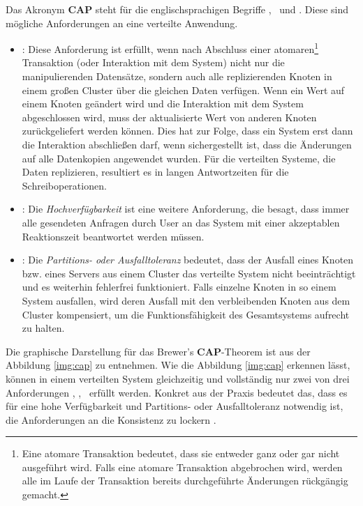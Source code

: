 Das Akronym \textbf{CAP} steht für die englischsprachigen Begriffe  \Cap, \cAp\ und \caP. Diese sind mögliche Anforderungen an eine verteilte Anwendung.
\begin{itemize}
\item \Cap: Diese Anforderung ist erfüllt, wenn nach Abschluss einer atomaren\footnote{Eine atomare Transaktion bedeutet, dass sie entweder ganz oder gar nicht ausgeführt wird. Falls eine atomare Transaktion abgebrochen wird, werden alle im Laufe der Transaktion bereits durchgeführte Änderungen rückgängig gemacht.} Transaktion (oder Interaktion mit dem System) nicht nur die manipulierenden Datensätze, sondern auch alle replizierenden Knoten in einem großen Cluster über die gleichen Daten verfügen. Wenn ein Wert auf einem Knoten geändert wird und die Interaktion mit dem System abgeschlossen wird, muss der aktualisierte Wert von anderen Knoten zurückgeliefert werden können. Dies hat zur Folge, dass ein System erst dann die Interaktion abschließen darf, wenn sichergestellt ist, dass die Änderungen auf alle Datenkopien angewendet wurden. Für die verteilten Systeme, die Daten replizieren, resultiert es in langen Antwortzeiten für die Schreiboperationen.

\item \cAp: Die \textit{Hochverfügbarkeit} ist eine weitere Anforderung, die besagt, dass immer alle gesendeten Anfragen durch User an das System mit einer akzeptablen Reaktionszeit beantwortet werden müssen.

\item \caP: Die \textit{Partitions- oder Ausfalltoleranz} bedeutet, dass der Ausfall eines Knoten bzw. eines Servers aus einem Cluster das verteilte System nicht beeinträchtigt und es weiterhin fehlerfrei funktioniert. Falls einzelne Knoten in so einem System ausfallen, wird deren Ausfall mit den verbleibenden Knoten aus dem Cluster kompensiert, um die Funktionsfähigkeit des Gesamtsystems aufrecht zu halten.

\end{itemize}

Die graphische Darstellung für das Brewer's \textbf{CAP}-Theorem ist aus der Abbildung \ref{img:cap} zu entnehmen. Wie die Abbildung \ref{img:cap} erkennen lässt, können in einem verteilten System gleichzeitig und vollständig nur zwei von drei Anforderungen  \Cap, \cAp, \caP\ erfüllt werden. Konkret aus der Praxis bedeutet das, dass es für eine hohe Verfügbarkeit und Partitions- oder Ausfalltoleranz notwendig ist, die Anforderungen an die Konsistenz zu lockern \cite[S. 31]{Edlich.2011}.

